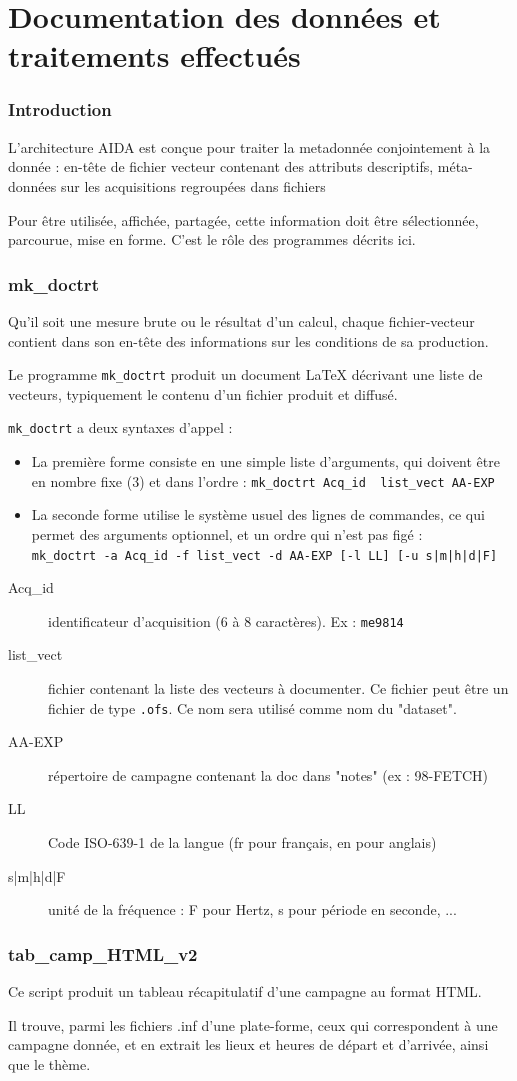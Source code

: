 \part{Documentation des données et traitements effectués}
\label{part:doc}
\section{Introduction}

   L'architecture AIDA est conçue pour traiter la metadonnée
conjointement à la donnée : 
en-tête de fichier vecteur contenant des attributs descriptifs,
méta-données sur les acquisitions regroupées dans fichiers 

    Pour être utilisée, affichée, partagée, cette information
doit être sélectionnée, parcourue, mise en forme. C'est le rôle 
des programmes décrits ici.


\section{mk\_doctrt}
     Qu'il soit une mesure brute ou le résultat d'un
calcul, chaque fichier-vecteur contient dans son en-tête 
des informations sur les conditions de sa production. 

Le programme \texttt{mk\_doctrt} produit un document \LaTeX
décrivant une liste de vecteurs, typiquement le contenu d'un
fichier produit et diffusé.

\texttt{mk\_doctrt} a deux syntaxes d'appel :
\begin{itemize}
\item La première forme consiste en une simple liste d'arguments, qui
doivent être en nombre fixe (3) et dans l'ordre : \lstinline[basicstyle=\ttfamily]{mk_doctrt Acq_id  list_vect AA-EXP}
\item La seconde forme utilise le système usuel des lignes
de commandes, ce qui permet des arguments optionnel, et un ordre qui
n'est pas figé :\\
 \lstinline[basicstyle=\ttfamily]
  {mk_doctrt -a Acq_id -f list_vect -d AA-EXP [-l LL] [-u s|m|h|d|F] }
\end{itemize}

\begin{description}
 \item[Acq\_id] identificateur d'acquisition (6 à 8 caractères). Ex : \texttt{me9814}
 \item[list\_vect] fichier contenant la liste des vecteurs à documenter. Ce
               fichier peut être un fichier de type \texttt{.ofs}.  
               Ce nom sera utilisé comme nom du "dataset".
 \item[AA-EXP] répertoire de campagne contenant la doc dans "notes" (ex : 98-FETCH)
 \item[LL] Code ISO-639-1 de la langue (fr pour français, en pour anglais)
 \item[s|m|h|d|F] unité de la fréquence : F pour Hertz, s pour période en seconde, ...
\end{description}

\section{tab\_camp\_HTML\_v2}

Ce script produit un tableau récapitulatif d'une campagne au format HTML.

Il trouve, parmi les fichiers .inf d'une plate-forme, ceux qui correspondent
à une campagne donnée, et en extrait les lieux et heures
de départ et d'arrivée, ainsi que le thème.
